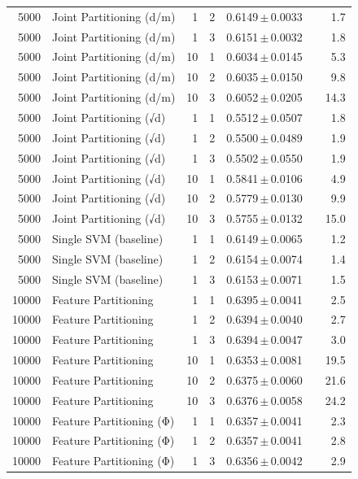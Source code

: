 \begin{table}[ht]
\begin{tabular}{rlrrccr}
5000 & Joint Partitioning (d/m) & 1 & 2 & 0.6149\,$\pm$\,0.0033 &  & 1.7 \\
5000 & Joint Partitioning (d/m) & 1 & 3 & 0.6151\,$\pm$\,0.0032 &  & 1.8 \\
5000 & Joint Partitioning (d/m) & 10 & 1 & 0.6034\,$\pm$\,0.0145 &  & 5.3 \\
5000 & Joint Partitioning (d/m) & 10 & 2 & 0.6035\,$\pm$\,0.0150 &  & 9.8 \\
5000 & Joint Partitioning (d/m) & 10 & 3 & 0.6052\,$\pm$\,0.0205 &  & 14.3 \\
5000 & Joint Partitioning (√d) & 1 & 1 & 0.5512\,$\pm$\,0.0507 &  & 1.8 \\
5000 & Joint Partitioning (√d) & 1 & 2 & 0.5500\,$\pm$\,0.0489 &  & 1.9 \\
5000 & Joint Partitioning (√d) & 1 & 3 & 0.5502\,$\pm$\,0.0550 &  & 1.9 \\
5000 & Joint Partitioning (√d) & 10 & 1 & 0.5841\,$\pm$\,0.0106 &  & 4.9 \\
5000 & Joint Partitioning (√d) & 10 & 2 & 0.5779\,$\pm$\,0.0130 &  & 9.9 \\
5000 & Joint Partitioning (√d) & 10 & 3 & 0.5755\,$\pm$\,0.0132 &  & 15.0 \\
5000 & Single SVM (baseline) & 1 & 1 & 0.6149\,$\pm$\,0.0065 &  & 1.2 \\
5000 & Single SVM (baseline) & 1 & 2 & 0.6154\,$\pm$\,0.0074 &  & 1.4 \\
5000 & Single SVM (baseline) & 1 & 3 & 0.6153\,$\pm$\,0.0071 &  & 1.5 \\
10000 & Feature Partitioning & 1 & 1 & 0.6395\,$\pm$\,0.0041 &  & 2.5 \\
10000 & Feature Partitioning & 1 & 2 & 0.6394\,$\pm$\,0.0040 &  & 2.7 \\
10000 & Feature Partitioning & 1 & 3 & 0.6394\,$\pm$\,0.0047 &  & 3.0 \\
10000 & Feature Partitioning & 10 & 1 & 0.6353\,$\pm$\,0.0081 &  & 19.5 \\
10000 & Feature Partitioning & 10 & 2 & 0.6375\,$\pm$\,0.0060 &  & 21.6 \\
10000 & Feature Partitioning & 10 & 3 & 0.6376\,$\pm$\,0.0058 &  & 24.2 \\
10000 & Feature Partitioning (Φ) & 1 & 1 & 0.6357\,$\pm$\,0.0041 &  & 2.3 \\
10000 & Feature Partitioning (Φ) & 1 & 2 & 0.6357\,$\pm$\,0.0041 &  & 2.8 \\
10000 & Feature Partitioning (Φ) & 1 & 3 & 0.6356\,$\pm$\,0.0042 &  & 2.9 \\

\end{tabular}
\end{table}
